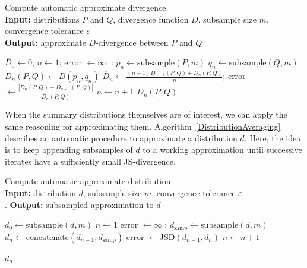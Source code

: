 \documentclass{article}
\begin{document}
\begin{algorithm}
    \caption{Compute automatic approximate divergence.\\
    \textbf{Input:} distributions $P$ and $Q$, divergence function $D$, subsample size $m$, convergence tolerance $\varepsilon$\\
    \textbf{Output:} approximate $D$-divergence between $P$ and $Q$
    }
    \label{DivergenceAveraging}
    \begin{algorithmic}
    \State $\overline{D}_0 \gets 0$;
    \State $n \gets 1$;
    \State error $\gets \infty$;
    :
    \State $p_n \gets \text{subsample}(P, m)$
    \State $q_n \gets \text{subsample}(Q, m)$
    \State $D_n(P, Q) \gets D(p_n, q_n)$
    \State $\overline{D}_n \gets \frac{(n - 1) \overline{D}_{n-1}(P, Q) + D_n(P, Q)}{n}$;
    \State error $\gets \frac{ \left| \overline D_n(P, Q) - \overline D_{n-1}(P, Q) \right|}
        { \overline D_n(P, Q) }$
    \State $n \gets n + 1$
    \EndWhile
    \Return $D_n(P, Q)$
\end{algorithmic}
\end{algorithm}


When the summary distributions themselves are of interest, we can apply the same reasoning for approximating them.
Algorithm~\ref{DistributionAveraging} describes an automatic procedure to approximate a distribution $d$.
Here, the idea is to keep appending subsamples of $d$ to a working approximation until successive iterates have a sufficiently small JS-divergence.
\begin{algorithm}
    \caption{Compute automatic approximate distribution.\\
        \textbf{Input:} distribution $d$, subsample size $m$, convergence tolerance $\varepsilon$\\.
        \textbf{Output:} subsampled approximation to $d$}
    \label{DistributionAveraging}
    \begin{algorithmic}
        \State $d_0 \gets \text{subsample}(d, m)$
        \State $n \gets 1$
        \State error $\gets \infty$
        :
        \State $d_\text{samp} \gets \text{subsample}(d, m)$
        \State $d_n \gets \text{concatenate}(d_{n-1}, d_\text{samp})$
        \State error $\gets \text{JSD}(d_{n-1}, d_n)$
        \State $n \gets n + 1$
        \EndWhile
    \end{algorithmic}
    \Return $d_n$

\end{algorithm}
\end{document}
